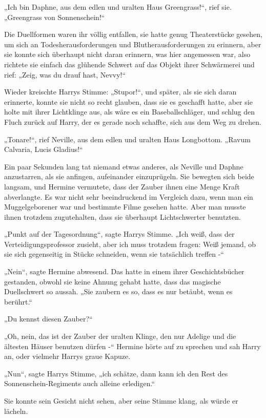 {„Ich bin Daphne, aus dem edlen und uralten Haus Greengrass!“, rief sie. „Greengrass von Sonnenschein!“

Die Duellformen waren ihr völlig entfallen, sie hatte genug Theaterstücke gesehen, um sich an Todesherausforderungen und Blutherausforderungen zu erinnern, aber sie konnte sich überhaupt nicht daran erinnern, was hier angemessen war, also richtete sie einfach das glühende Schwert auf das Objekt ihrer Schwärmerei und rief: „Zeig, was du drauf hast, Nevvy!“

Wieder kreischte Harrys Stimme: „Stupor!“, und später, als sie sich daran erinnerte, konnte sie nicht so recht glauben, dass sie es geschafft hatte, aber sie holte mit ihrer Lichtklinge aus, als wäre es ein Baseballschläger, und schlug den Fluch zurück auf Harry, der es gerade noch schaffte, sich aus dem Weg zu drehen.

„Tonare!“, rief Neville, aus dem edlen und uralten Haus Longbottom. „Ravum Calvaria, Lucis Gladius!“

Ein paar Sekunden lang tat niemand etwas anderes, als Neville und Daphne anzustarren, als sie anfingen, aufeinander einzuprügeln. Sie bewegten sich beide langsam, und Hermine vermutete, dass der Zauber ihnen eine Menge Kraft abverlangte. Es war nicht sehr beeindruckend im Vergleich dazu, wenn man ein Muggelgeborener war und bestimmte Filme gesehen hatte. Aber man musste ihnen trotzdem zugutehalten, dass sie überhaupt Lichtschwerter benutzten.

„Punkt auf der Tagesordnung“, sagte Harrys Stimme. „Ich weiß, dass der Verteidigungsprofessor zusieht, aber ich muss trotzdem fragen: Weiß jemand, ob sie sich gegenseitig in Stücke schneiden, wenn sie tatsächlich treffen -“

„Nein“, sagte Hermine abwesend. Das hatte in einem ihrer Geschichtsbücher gestanden, obwohl sie keine Ahnung gehabt hatte, dass das magische Duellschwert so aussah. „Sie zaubern es so, dass es nur betäubt, wenn es berührt.“

„Du kennst diesen Zauber?“

„Oh, nein, das ist der Zauber der uralten Klinge, den nur Adelige und die ältesten Häuser benutzen dürfen -“ Hermine hörte auf zu sprechen und sah Harry an, oder vielmehr Harrys graue Kapuze.

„Nun“, sagte Harrys Stimme, „ich schätze, dann kann ich den Rest des Sonnenschein-Regiments auch alleine erledigen.“

Sie konnte sein Gesicht nicht sehen, aber seine Stimme klang, als würde er lächeln.

}
